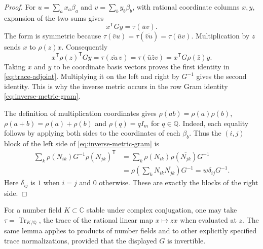 \documentclass[10pt]{article}
\newcommand{\Q}{\mathbb Q}
\newcommand{\Tr}{\operatorname{Tr}}
\begin{document}
\begin{proof}
For $u=\sum_a x_a\beta_a$ and $v=\sum_b y_b\beta_b$, with rational
coordinate columns $x,y$, expansion of the two sums gives
\[
 x^{\mathsf T}Gy=\tau(\bar u v).
\]
The form is symmetric because
$\tau(\bar v u)=\tau(\overline{\bar v u})=\tau(\bar u v)$.
Multiplication by $z$ sends $x$ to $\rho(z)x$. Consequently
\[
 x^{\mathsf T}\rho(z)^{\mathsf T}Gy
 =\tau(\overline{zu}\,v)
 =\tau(\bar u\bar z v)
 =x^{\mathsf T}G\rho(\bar z)y.
\]
Taking $x$ and $y$ to be coordinate basis vectors proves the first
identity in \eqref{eq:trace-adjoint}. Multiplying it on the left and
right by $G^{-1}$ gives the second identity. This is why the inverse
metric occurs in the row Gram identity \eqref{eq:inverse-metric-gram}.

The definition of multiplication coordinates gives
$\rho(ab)=\rho(a)\rho(b)$, $\rho(a+b)=\rho(a)+\rho(b)$ and
$\rho(q)=qI_m$ for $q\in\Q$. Indeed, each equality follows by applying
both sides to the coordinates of each $\beta_b$.
Thus the $(i,j)$ block of the left side of
\eqref{eq:inverse-metric-gram} is
\begin{align*}
 \sum_k\rho(N_{ik})G^{-1}\rho(N_{jk})^{\mathsf T}
 &=\sum_k\rho(N_{ik})\rho(\overline{N_{jk}})G^{-1}\\
 &=\rho\!\left(\sum_k N_{ik}\overline{N_{jk}}\right)G^{-1}
 =w\delta_{ij}G^{-1}.
\end{align*}
Here $\delta_{ij}$ is $1$ when $i=j$ and $0$ otherwise. These are
exactly the blocks of the right side.
\end{proof}

For a number field $K\subset\mathbb C$ stable under complex
conjugation, one may take $\tau=\Tr_{K/\Q}$, the trace of the rational
linear map $x\mapsto zx$ when evaluated at $z$. The same lemma applies
to products of number fields and to other explicitly specified trace
normalizations, provided that the displayed $G$ is invertible.
\end{document}
